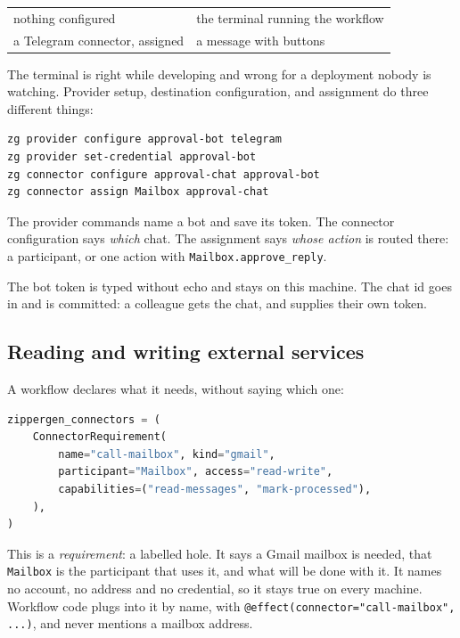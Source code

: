 \documentclass[11pt,a4paper]{article}
\begin{document}
\begin{center}
\begin{tabularx}{0.95\linewidth}{@{}lX@{}}
\toprule
nothing configured & the terminal running the workflow \\
a Telegram connector, assigned & a message with buttons \\
\bottomrule
\end{tabularx}
\end{center}

The terminal is right while developing and wrong for a deployment nobody is
watching. Provider setup, destination configuration, and assignment do three
different things:

\begin{lstlisting}[style=shell]
zg provider configure approval-bot telegram
zg provider set-credential approval-bot
zg connector configure approval-chat approval-bot
zg connector assign Mailbox approval-chat
\end{lstlisting}

The provider commands name a bot and save its token. The connector
configuration says \emph{which} chat. The assignment says \emph{whose action}
is routed there: a participant, or one action with
\texttt{Mailbox.approve\_reply}.

The bot token is typed without echo and stays on this machine. The chat id goes
in  and is committed: a colleague gets the chat, and
supplies their own token.

\subsection{Reading and writing external services}

A workflow declares what it needs, without saying which one:

\begin{lstlisting}[language=Python]
zippergen_connectors = (
    ConnectorRequirement(
        name="call-mailbox", kind="gmail",
        participant="Mailbox", access="read-write",
        capabilities=("read-messages", "mark-processed"),
    ),
)
\end{lstlisting}

This is a \emph{requirement}: a labelled hole. It says a Gmail mailbox is
needed, that \texttt{Mailbox} is the participant that uses it, and what will
be done with it. It names no account, no address and no credential, so it
stays true on every machine. Workflow code plugs into it by name, with
\texttt{@effect(connector="call-mailbox", ...)}, and never mentions a mailbox
address.
\end{document}

